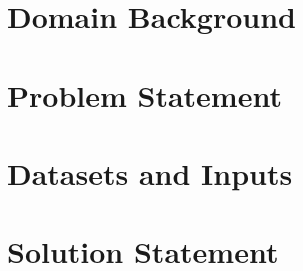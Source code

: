 \documentclass[10pt,a4paper]{article}
\begin{document}

\section{Domain Background}



\section{Problem Statement}


\section{Datasets and Inputs}


\section{Solution Statement}
\end{document}
